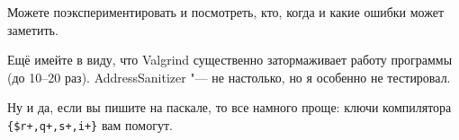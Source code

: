 \documentclass[a4paper,10pt]{problems}
\begin{document}
Можете поэкспериментировать и посмотреть, кто, когда и какие ошибки может заметить.

Ещё имейте в виду, что Valgrind существенно затормаживает работу программы (до 10--20 раз). 
Address\-Sanitizer "--- не настолько, но я особенно не тестировал.

Ну и да, если вы пишите на паскале, то все намного проще: ключи компилятора \verb`{$r+,q+,s+,i+}` вам помогут.

\end{document}
